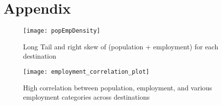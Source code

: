 \chapter{Appendix}


\begin{figure}[H]
\centering
\texttt{[image: popEmpDensity]}
\caption{Long Tail and right skew of (population + employment) for each destination}
\label{fig:pop-emp-density}
\end{figure}


\begin{figure}[H]
\centering
\texttt{[image: employment\_correlation\_plot]}
\caption{High correlation between population, employment, and various employment categories across destinations}
\label{fig:pop-emp-correlation}
\end{figure}

